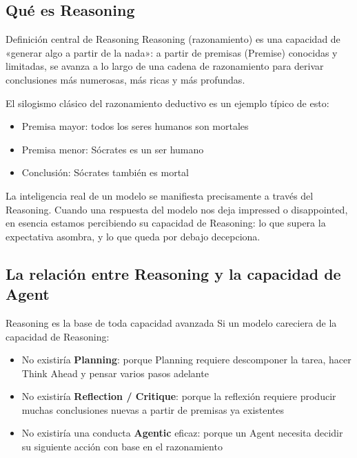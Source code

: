 \documentclass[a4paper]{article}
\begin{document}
\subsection{Qué es Reasoning}

\begin{importantbox}{Definición central de Reasoning}
Reasoning (razonamiento) es una capacidad de «generar algo a partir de la nada»: a partir de premisas (Premise) conocidas y limitadas, se avanza a lo largo de una cadena de razonamiento para derivar conclusiones más numerosas, más ricas y más profundas.
\end{importantbox}

El silogismo clásico del razonamiento deductivo es un ejemplo típico de esto:
\begin{itemize}
    \item Premisa mayor: todos los seres humanos son mortales
    \item Premisa menor: Sócrates es un ser humano
    \item Conclusión: Sócrates también es mortal
\end{itemize}

La inteligencia real de un modelo se manifiesta precisamente a través del Reasoning. Cuando una respuesta del modelo nos deja impressed o disappointed, en esencia estamos percibiendo su capacidad de Reasoning: lo que supera la expectativa asombra, y lo que queda por debajo decepciona.

\subsection{La relación entre Reasoning y la capacidad de Agent}

\begin{knowledgebox}{Reasoning es la base de toda capacidad avanzada}
Si un modelo careciera de la capacidad de Reasoning:
\begin{itemize}
    \item No existiría \textbf{Planning}: porque Planning requiere descomponer la tarea, hacer Think Ahead y pensar varios pasos adelante
    \item No existiría \textbf{Reflection / Critique}: porque la reflexión requiere producir muchas conclusiones nuevas a partir de premisas ya existentes
    \item No existiría una conducta \textbf{Agentic} eficaz: porque un Agent necesita decidir su siguiente acción con base en el razonamiento
\end{itemize}
\end{knowledgebox}
\end{document}
